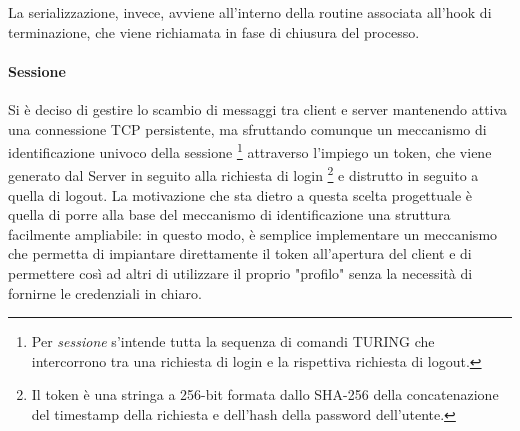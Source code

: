 La serializzazione, invece, avviene all'interno della routine associata all'hook di terminazione, che viene richiamata in fase di chiusura del processo.

\paragraph{Sessione}
Si è deciso di gestire lo scambio di messaggi tra client e server mantenendo attiva una connessione TCP persistente, ma sfruttando comunque un meccanismo di identificazione univoco della sessione \footnote{Per \textit{sessione} s'intende tutta la sequenza di comandi TURING che intercorrono tra una richiesta di login e la rispettiva richiesta di logout.} attraverso l'impiego un token, che viene generato dal Server in seguito alla richiesta di login \footnote{Il token è una stringa a 256-bit formata dallo SHA-256 della concatenazione del timestamp della richiesta e dell'hash della password dell'utente.} e distrutto in seguito a quella di logout. La motivazione che sta dietro a questa scelta progettuale è quella di porre alla base del meccanismo di identificazione una struttura facilmente ampliabile: in questo modo, è semplice implementare un meccanismo che permetta di impiantare direttamente il token all'apertura del client e di permettere così ad altri di utilizzare il proprio "profilo" senza la necessità di fornirne le credenziali in chiaro.

